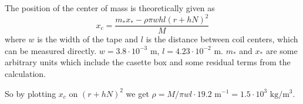 The position of the center of mass is theoretically given as
\begin{equation}
    x_c = \frac{m_* x_* - \rho \pi w h l (r + h N)^2 }{M}
\end{equation}
where $w$ is the width of the tape and
$l$ is the distance between coil centers,
which can be measured directly.
$w = 3.8 \cdot 10^{-3}\text{ m}$, $l = 4.23 \cdot 10^{-2}\text{ m}$.
$m_*$ and $x_*$ are some arbitrary units
which include the casette box and some residual terms from the calculation.

So by plotting $x_c$ on $(r + h N)^2$  we get
$\rho = M / \pi w l \cdot 19.2 \text{ m}^{-1} = 1.5 \cdot 10^3 \text{ kg} / \text{m}^3$.

